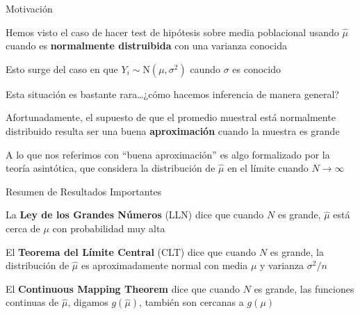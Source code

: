 \documentclass[11pt,handout,aspectratio=169]{beamer}
\newenvironment{wideitemize}{\itemize\addtolength{\itemsep}{10pt}}{\enditemize}
\begin{document}
\begin{frame}{Motivación}

\begin{wideitemize}
	
\item 
Hemos visto el caso de hacer test de hipótesis sobre media poblacional usando $\hat\mu$ cuando es \textbf{normalmente distruibida} con una varianza conocida

\item
Esto surge del caso en que $Y_i\sim \mathrm{N}(\mu,\sigma^2)$ caundo $\sigma$	es conocido

\item
Esta situación es bastante rara\dots ¿cómo hacemos inferencia de manera general?

\pause

\item
Afortunadamente, el supuesto de que el promedio muestral está normalmente distribuido resulta ser una buena \textbf{aproximación} cuando la muestra es grande

\pause
\item
A lo que nos referimos con  ``buena aproximación'' es algo formalizado por la teoría asintótica, que considera la distribución de $\hat\mu$ en el límite cuando $N \rightarrow \infty$
	
\end{wideitemize}		

\end{frame}


\begin{frame}{Resumen de Resultados Importantes}
	
\begin{wideitemize}

\item La \textbf{Ley de los Grandes Números} (LLN) dice que cuando $N$ es grande, $\hat\mu$ está cerca de $\mu$ con probabilidad muy alta


\pause
\item El \textbf{Teorema del Límite Central} (CLT) dice que cuando $N$ es grande, la distribución de $\hat\mu$ es aproximadamente normal con media $\mu$ y varianza $\sigma^2/n$

\pause
\item El \textbf{Continuous Mapping Theorem} dice que cuando $N$ es grande, las funciones continuas de $\hat\mu$, digamos $g(\hat\mu)$, también son cercanas a $g(\mu)$


\end{wideitemize}	
\end{frame}
\end{document}
